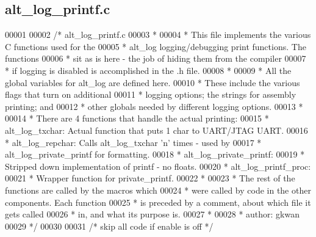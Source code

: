 \subsection{alt\+\_\+log\+\_\+printf.\+c}
\label{alt__log__printf_8c_source}

\begin{DoxyCode}
00001 
00002 \textcolor{comment}{/* alt\_log\_printf.c}
00003 \textcolor{comment}{ *}
00004 \textcolor{comment}{ * This file implements the various C functions used for the }
00005 \textcolor{comment}{ * alt\_log logging/debugging print functions.  The functions}
00006 \textcolor{comment}{ * sit as is here - the job of hiding them from the compiler}
00007 \textcolor{comment}{ * if logging is disabled is accomplished in the .h file. }
00008 \textcolor{comment}{ *}
00009 \textcolor{comment}{ * All the global variables for alt\_log are defined here.  }
00010 \textcolor{comment}{ * These include the various flags that turn on additional }
00011 \textcolor{comment}{ * logging options; the strings for assembly printing; and}
00012 \textcolor{comment}{ * other globals needed by different logging options. }
00013 \textcolor{comment}{ *}
00014 \textcolor{comment}{ * There are 4 functions that handle the actual printing: }
00015 \textcolor{comment}{ * alt\_log\_txchar: Actual function that puts 1 char to UART/JTAG UART.}
00016 \textcolor{comment}{ * alt\_log\_repchar: Calls alt\_log\_txchar 'n' times - used by}
00017 \textcolor{comment}{ *            alt\_log\_private\_printf for formatting.}
00018 \textcolor{comment}{ * alt\_log\_private\_printf:}
00019 \textcolor{comment}{ *     Stripped down implementation of printf - no floats.}
00020 \textcolor{comment}{ * alt\_log\_printf\_proc:}
00021 \textcolor{comment}{ *     Wrapper function for private\_printf.}
00022 \textcolor{comment}{ * }
00023 \textcolor{comment}{ * The rest of the functions are called by the macros which}
00024 \textcolor{comment}{ * were called by code in the other components.  Each function}
00025 \textcolor{comment}{ * is preceded by a comment, about which file it gets called}
00026 \textcolor{comment}{ * in, and what its purpose is.}
00027 \textcolor{comment}{ *}
00028 \textcolor{comment}{ * author: gkwan}
00029 \textcolor{comment}{ */}
00030 
00031 \textcolor{comment}{/* skip all code if enable is off */}

\end{DoxyCode}
